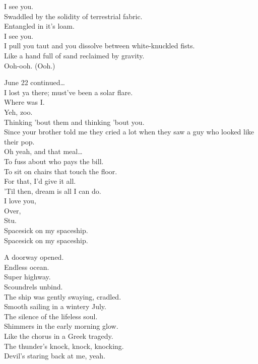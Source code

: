 
I see you. \\
Swaddled by the solidity of terrestrial fabric. \\
Entangled in it's loam. \\
I see you. \\
I pull you taut and you dissolve between white-knuckled fists. \\
Like a hand full of sand reclaimed by gravity. \\
Ooh-ooh. (Ooh.) \\


June 22 continued… \\
I lost ya there; must've been a solar flare. \\
Where was I. \\
Yeh, zoo. \\
Thinking 'bout them and thinking 'bout you. \\
Since your brother told me they cried a lot when they saw a guy who looked like their pop. \\
Oh yeah, and that meal… \\
To fuss about who pays the bill. \\
To sit on chairs that touch the floor. \\
For that, I'd give it all. \\
'Til then, dream is all I can do. \\
I love you, \\
Over, \\
Stu. \\

Spacesick on my spaceship. \\
Spacesick on my spaceship. \\




A doorway opened. \\
Endless ocean. \\
Super highway. \\
Scoundrels unbind. \\
The ship was gently swaying, cradled. \\
Smooth sailing in a wintery July. \\
The silence of the lifeless soul. \\
Shimmers in the early morning glow. \\
Like the chorus in a Greek tragedy. \\
The thunder's knock, knock, knocking. \\
Devil's staring back at me, yeah. \\

